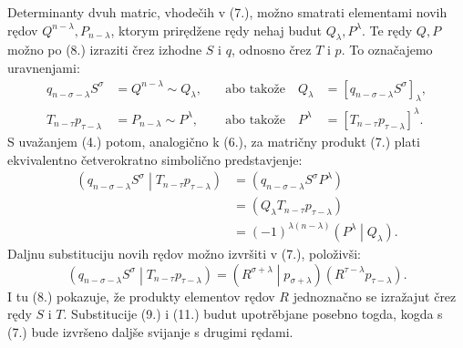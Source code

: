 \documentclass[11pt]{article}
\newcommand{\pair}[2]{\left(#1\middle|#2\right)}
\begin{document}
Determinanty dvuh matric, vhodečih v (7.), možno smatrati elementami novih rędov $Q^{n-\lambda},P_{n-\lambda}$, ktorym prirędžene rędy nehaj budut $Q_\lambda,P^\lambda$. Te rędy $Q,P$ možno po (8.) izraziti črez izhodne $S$ i $q$, odnosno črez $T$ i $p$. To označajemo uravnenjami:
\begin{equation}
\begin{aligned}
 q_{n-\sigma-\lambda}S^\sigma&=Q^{n-\lambda}\sim Q_\lambda,
 &\quad\text{abo takože}\quad Q_\lambda&=[q_{n-\sigma-\lambda}S^\sigma]_\lambda,\\
 T_{n-\tau}p_{\tau-\lambda}&=P_{n-\lambda}\sim P^\lambda,
 &\quad\text{abo takože}\quad P^\lambda&=[T_{n-\tau}p_{\tau-\lambda}]^\lambda.
\end{aligned}
\tag{9}
\end{equation}
S uvažanjem (4.) potom, analogično k (6.), za matričny produkt (7.) plati ekvivalentno četverokratno simbolično predstavjenje:
\begin{equation}
\begin{aligned}
\pair{q_{n-\sigma-\lambda}S^\sigma}{T_{n-\tau}p_{\tau-\lambda}}
&=(q_{n-\sigma-\lambda}S^\sigma P^\lambda)\\
&=(Q_\lambda T_{n-\tau}p_{\tau-\lambda})\\
&=(-1)^{\lambda(n-\lambda)}\pair{P^\lambda}{Q_\lambda}.
\end{aligned}
\tag{10}
\end{equation}
Daljnu substituciju novih rędov možno izvršiti v (7.), položivši:
\begin{equation}
 \pair{q_{n-\sigma-\lambda}S^\sigma}{T_{n-\tau}p_{\tau-\lambda}}
 =\pair{R^{\sigma+\lambda}}{p_{\sigma+\lambda}}(R^{\tau-\lambda}p_{\tau-\lambda}).
\tag{11}
\end{equation}
I tu (8.) pokazuje, že produkty elementov rędov $R$ jednoznačno se izražajut črez rędy $S$ i $T$. Substitucije (9.) i (11.) budut upotrěbjane posebno togda, kogda s (7.) bude izvršeno daljše svijanje s drugimi rędami.
\end{document}
